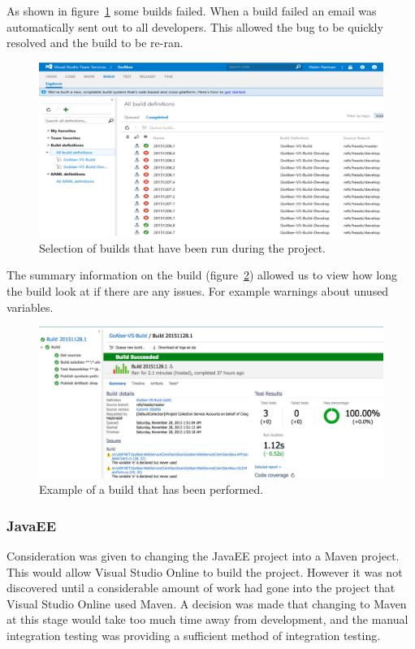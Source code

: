 As shown in figure~\ref{fig:testing_vsBuild} some builds failed. When a build failed an email was automatically sent out to all developers. This allowed the bug to be quickly resolved and the build to be re-ran.


\begin{figure}[H]
\begin{center}
\includegraphics[scale=0.3]{images/testing/builds.png} 
\caption{Selection of builds that have been run during the project.}
\label{fig:testing_vsBuild}
\end{center}
\end{figure}

The summary information on the build (figure~\ref{fig:testing_vsBuildExample}) allowed us to view how long the build look at if there are any issues. For example warnings about unused variables.

\begin{figure}[H]
\begin{center}
\includegraphics[scale=0.3]{images/testing/ExampleBuild.png} 
\caption{Example of a build that has been performed.}
\label{fig:testing_vsBuildExample}
\end{center}
\end{figure}

\subsubsection{JavaEE}
Consideration was given to changing the JavaEE project into a Maven project. This would allow Visual Studio Online to build the project. However it was not discovered until a considerable amount of work had gone into the project that Visual Studio Online used Maven. A decision was made that changing to Maven at this stage would take too much time away from development, and the manual integration testing was providing a sufficient method of integration testing.


